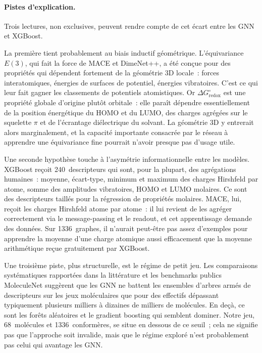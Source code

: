 \paragraph{Pistes d'explication.}
Trois lectures, non exclusives, peuvent rendre compte de cet écart entre les GNN et XGBoost.

La première tient probablement au biais inductif géométrique. L'équivariance $E(3)$, qui fait la force de MACE et DimeNet++, a été conçue pour des propriétés qui dépendent fortement de la géométrie 3D locale~: forces interatomiques, énergies de surfaces de potentiel, énergies vibratoires. C'est ce qui leur fait gagner les classements de potentiels atomistiques. Or $\Delta G^\circ_\text{redox}$ est une propriété globale d'origine plutôt orbitale~: elle paraît dépendre essentiellement de la position énergétique du HOMO et du LUMO, des charges agrégées sur le squelette $\pi$ et de l'écrantage diélectrique du solvant. La géométrie 3D y entrerait alors marginalement, et la capacité importante consacrée par le réseau à apprendre une équivariance fine pourrait n'avoir presque pas d'usage utile.

Une seconde hypothèse touche à l'asymétrie informationnelle entre les modèles. XGBoost reçoit 240~descripteurs qui sont, pour la plupart, des agrégations humaines~: moyenne, écart-type, minimum et maximum des charges Hirshfeld par atome, somme des amplitudes vibratoires, HOMO et LUMO molaires. Ce sont des descripteurs taillés pour la régression de propriétés molaires. MACE, lui, reçoit les charges Hirshfeld atome par atome~: il lui revient de les agréger correctement via le message-passing et le readout, et cet apprentissage demande des données. Sur 1336~graphes, il n'aurait peut-être pas assez d'exemples pour apprendre la \og{}moyenne d'une charge atomique\fg{} aussi efficacement que la moyenne arithmétique reçue gratuitement par XGBoost.

Une troisième piste, plus structurelle, est le régime de petit jeu. Les comparaisons systématiques rapportées dans la littérature\cite{schutt2017schnet} et les benchmarks publics MoleculeNet suggèrent que les GNN ne battent les ensembles d'arbres armés de descripteurs sur les jeux moléculaires que pour des effectifs dépassant typiquement plusieurs milliers à dizaines de milliers de molécules. En deçà, ce sont les forêts aléatoires et le gradient boosting qui semblent dominer. Notre jeu, 68~molécules et 1336~conformères, se situe en dessous de ce seuil~; cela ne signifie pas que l'approche soit invalide, mais que le régime exploré n'est probablement pas celui qui avantage les GNN.

